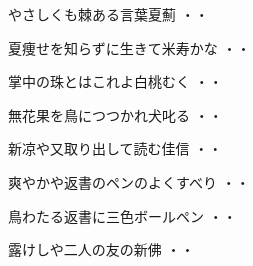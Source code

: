 \vspace{0.6cm}
\begin{shiika}やさしくも棘ある言葉夏薊
\hfill{・・}\end{shiika}
\vspace{0.6cm}
\begin{shiika}夏痩せを知らずに生きて米寿かな
\hfill{・・}\end{shiika}
\vspace{0.6cm}
\begin{shiika}掌中の珠とはこれよ白桃むく
\hfill{・・}\end{shiika}
\vspace{0.6cm}
\begin{shiika}無花果を鳥につつかれ犬叱る
\hfill{・・}\end{shiika}
\vspace{0.6cm}
\begin{shiika}新凉や又取り出して読む佳信
\hfill{・・}\end{shiika}
\vspace{0.6cm}
\begin{shiika}爽やかや返書のペンのよくすべり
\hfill{・・}\end{shiika}
\vspace{0.6cm}
\begin{shiika}鳥わたる返書に三色ボールペン
\hfill{・・}\end{shiika}
\vspace{0.6cm}
\begin{shiika}露けしや二人の友の新佛
\hfill{・・}\end{shiika}
\vspace{0.6cm}

